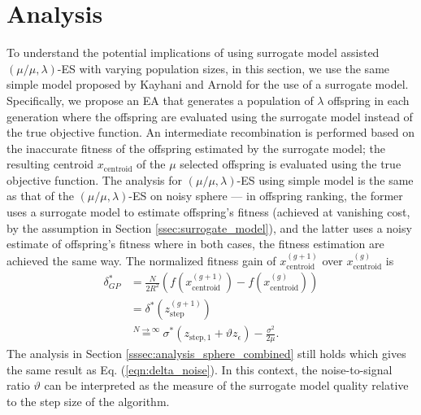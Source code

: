 

\section{Analysis}\label{sec:analysis}

To understand the potential implications of using surrogate model assisted $(\mu/\mu,\lambda)$-ES with varying population sizes, in this section, we use the same simple model proposed by Kayhani and Arnold \cite{DBLP:conf/ppsn/KayhaniA18} for the use of a surrogate model. Specifically, we propose an EA that generates a population of $\lambda$ offspring in each generation where the offspring are evaluated using the surrogate model instead of the true objective function. An intermediate recombination is performed based on the inaccurate fitness of the offspring estimated by the surrogate model; the resulting centroid $x_{\text{centroid}}$ of the $\mu$ selected offspring is evaluated using the true objective function. The analysis for $(\mu/\mu,\lambda)$-ES using simple model is the same as that of the $(\mu/\mu,\lambda)$-ES on noisy sphere --- in offspring ranking, the former uses a surrogate model to estimate offspring's fitness (achieved at vanishing cost, by the assumption in Section \ref{ssec:surrogate_model}), and the latter uses a noisy estimate of offspring's fitness where in both cases, the fitness estimation are achieved the same way. The normalized fitness gain of $x_{\text{centroid}}^{(g+1)}$ over $x_{\text{centroid}}^{(g)}$ is 
\begin{align}
\delta_{GP}^* &=  \frac{N}{2R^2}\left( f( x_{\text{centroid}}^{(g+1)} ) - f( x_{\text{centroid}}^{(g)} ) \right)  \nonumber\\ 
& = \delta^*(z_{\text{step}}^{(g+1)}) \nonumber\\ 
&\overset{N \rightarrow \infty}{=} \sigma^* (z_{\text{step},1} + \vartheta z_\epsilon ) - \frac{\sigma^2}{2 \mu}. \label{eqn:delta_surrogate}{}
\end{align}
The analysis in Section \ref{sssec:analysis_sphere_combined} still holds which gives the same result as Eq. (\ref{eqn:delta_noise}). In this context, the noise-to-signal ratio $\vartheta$ can be interpreted as the measure of the surrogate model quality relative to the step size of the algorithm. 
